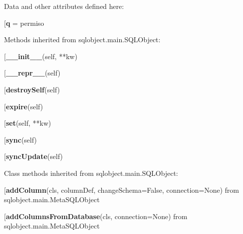 Data and other attributes defined here:\\
\begin{description}\item[{\bf q} = permiso\end{description}


Methods inherited from sqlobject.main.SQLObject:\\
\begin{description}\item[{\bf \_\_init\_\_}(self, **kw)\end{description}

\begin{description}\item[{\bf \_\_repr\_\_}(self)\end{description}

\begin{description}\item[{\bf destroySelf}(self)\end{description}

\begin{description}\item[{\bf expire}(self)\end{description}

\begin{description}\item[{\bf set}(self, **kw)\end{description}

\begin{description}\item[{\bf sync}(self)\end{description}

\begin{description}\item[{\bf syncUpdate}(self)\end{description}


Class methods inherited from sqlobject.main.SQLObject:\\
\begin{description}\item[{\bf addColumn}(cls, columnDef, changeSchema=False, connection=None) from sqlobject.main.MetaSQLObject\end{description}

\begin{description}\item[{\bf addColumnsFromDatabase}(cls, connection=None) from sqlobject.main.MetaSQLObject\end{description}

